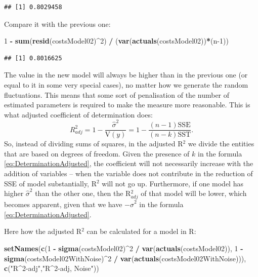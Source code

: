 \documentclass[
]{book}
\newenvironment{Shaded}{\begin{snugshade}}{\end{snugshade}}
\newcommand{\DecValTok}[1]{\textcolor[rgb]{0.00,0.00,0.81}{#1}}
\newcommand{\FunctionTok}[1]{\textcolor[rgb]{0.13,0.29,0.53}{\textbf{#1}}}
\newcommand{\NormalTok}[1]{#1}
\newcommand{\SpecialCharTok}[1]{\textcolor[rgb]{0.81,0.36,0.00}{\textbf{#1}}}
\newcommand{\StringTok}[1]{\textcolor[rgb]{0.31,0.60,0.02}{#1}}
\theoremstyle{definition}
\theoremstyle{definition}
\theoremstyle{definition}
\theoremstyle{definition}
\theoremstyle{remark}
\begin{document}
\begin{verbatim}
## [1] 0.8029458
\end{verbatim}

Compare it with the previous one:

\begin{Shaded}
\begin{Highlighting}[]
\DecValTok{1} \SpecialCharTok{{-}} \FunctionTok{sum}\NormalTok{(}\FunctionTok{resid}\NormalTok{(costsModel02)}\SpecialCharTok{\^{}}\DecValTok{2}\NormalTok{) }\SpecialCharTok{/}
\NormalTok{    (}\FunctionTok{var}\NormalTok{(}\FunctionTok{actuals}\NormalTok{(costsModel02))}\SpecialCharTok{*}\NormalTok{(n}\DecValTok{{-}1}\NormalTok{))}
\end{Highlighting}
\end{Shaded}

\begin{verbatim}
## [1] 0.8016625
\end{verbatim}

The value in the new model will always be higher than in the previous one (or equal to it in some very special cases), no matter how we generate the random fluctuations. This means that some sort of penalisation of the number of estimated parameters is required to make the measure more reasonable. This is what adjusted coefficient of determination does:
\begin{equation}
    R^2_{adj} = 1 - \frac{\hat{\sigma}^2}{\mathrm{V}(y)} = 1 - \frac{(n-1)\mathrm{SSE}}{(n-k)\mathrm{SST}} .
    \label{eq:DeterminationAdjusted}
\end{equation}
So, instead of dividing sums of squares, in the adjusted R\(^2\) we divide the entities that are based on degrees of freedom. Given the presence of \(k\) in the formula \eqref{eq:DeterminationAdjusted}, the coefficient will not necessarily increase with the addition of variables -- when the variable does not contribute in the reduction of SSE of model substantially, R\(^2\) will not go up. Furthermore, if one model has higher \(\hat{\sigma}^2\) than the other one, then the R\(^2_{adj}\) of that model will be lower, which becomes apparent, given that we have \(-\hat{\sigma}^2\) in the formula \eqref{eq:DeterminationAdjusted}.

Here how the adjusted R\(^2\) can be calculated for a model in R:

\begin{Shaded}
\begin{Highlighting}[]
\FunctionTok{setNames}\NormalTok{(}\FunctionTok{c}\NormalTok{(}\DecValTok{1} \SpecialCharTok{{-}} \FunctionTok{sigma}\NormalTok{(costsModel02)}\SpecialCharTok{\^{}}\DecValTok{2} \SpecialCharTok{/} \FunctionTok{var}\NormalTok{(}\FunctionTok{actuals}\NormalTok{(costsModel02)),}
           \DecValTok{1} \SpecialCharTok{{-}} \FunctionTok{sigma}\NormalTok{(costsModel02WithNoise)}\SpecialCharTok{\^{}}\DecValTok{2} \SpecialCharTok{/} \FunctionTok{var}\NormalTok{(}\FunctionTok{actuals}\NormalTok{(costsModel02WithNoise))),}
         \FunctionTok{c}\NormalTok{(}\StringTok{"R\^{}2{-}adj"}\NormalTok{,}\StringTok{"R\^{}2{-}adj, Noise"}\NormalTok{))}
\end{Highlighting}
\end{Shaded}
\end{document}
